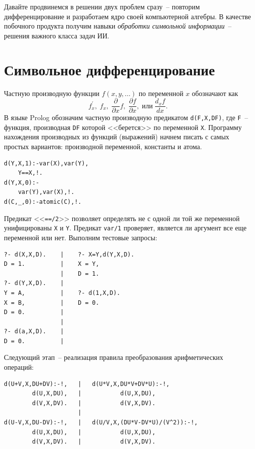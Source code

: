 \documentclass[a4paper,14pt, openany, twoside, final]{extbook} %
\begin{document}
Давайте продвинемся в решении двух проблем сразу~-- повторим дифференцирование и разработаем ядро своей компьютерной алгебры.  В качестве побочного продукта получим навыки \emph{обработки символьной информации}~-- решения важного класса задач ИИ.

\section{Символьное дифференцирование}
\label{sec:}


Частную производную функции $f(x,y,\ldots)$ по переменной $x$ обозначают как
$$
f^{\prime}_x,\;f_x,\;\frac{\partial }{\partial x}f,\;\frac{\partial f}{\partial x}, \;\mbox{или}\; \frac{d_x f}{dx}.
$$
В языке Prolog обозначим частную производную предикатом \texttt{d(F,X,DF)}, где \texttt{F}~-- функция, производная \texttt{DF} которой <<берется>> по переменной \texttt{X}.  Программу нахождения производных из функций (выражений) начнем писать с самых простых вариантов: производной переменной, константы и атома.

\begin{verbatim}
d(Y,X,1):-var(X),var(Y),
    Y==X,!.
d(Y,X,0):-
    var(Y),var(X),!.
d(C,_,0):-atomic(C),!.
\end{verbatim}

Предикат <<\texttt{==/2}>> позволяет определять не с одной ли той же переменной унифицированы \texttt{X} и \texttt{Y}.  Предикат \texttt{var/1} проверяет, является ли аргумент все еще переменной или нет.  Выполним тестовые запросы:

\begin{verbatim}
?- d(X,X,D).    |    ?- X=Y,d(Y,X,D).
D = 1.          |    X = Y,
                |    D = 1.
?- d(Y,X,D).    |
Y = A,          |    ?- d(1,X,D).
X = B,          |    D = 0.
D = 0.          |
                |
?- d(a,X,D).    |
D = 0.          |
\end{verbatim}

Следующий этап~-- реализация правила преобразования арифметических операций:

\begin{verbatim}
d(U+V,X,DU+DV):-!,   |   d(U*V,X,DU*V+DV*U):-!,
        d(U,X,DU),   |           d(U,X,DU),
        d(V,X,DV).   |           d(V,X,DV).
                     |
d(U-V,X,DU-DV):-!,   |   d(U/V,X,(DU*V-DV*U)/(V^2)):-!,
        d(U,X,DU),   |           d(U,X,DU),
        d(V,X,DV).   |           d(V,X,DV).
\end{verbatim}
\end{document}
